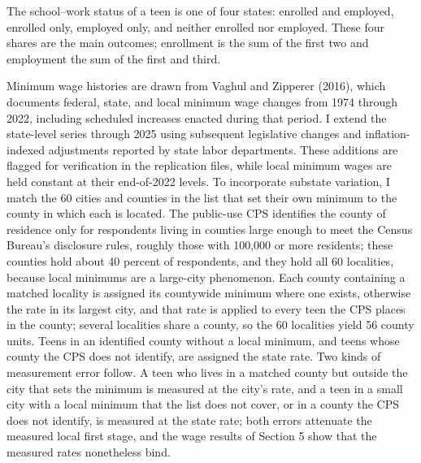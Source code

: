 \documentclass[12pt]{article}
\begin{document}
The school--work status of a teen is one of four states: enrolled and employed, enrolled only, employed only, and neither enrolled nor employed. These four shares are the main outcomes; enrollment is the sum of the first two and employment the sum of the first and third.

Minimum wage histories are drawn from Vaghul and Zipperer (2016), which documents federal, state, and local minimum wage changes from 1974 through 2022, including scheduled increases enacted during that period. I extend the state-level series through 2025 using subsequent legislative changes and inflation-indexed adjustments reported by state labor departments. These additions are flagged for verification in the replication files, while local minimum wages are held constant at their end-of-2022 levels. To incorporate substate variation, I match the 60 cities and counties in the list that set their own minimum to the county in which each is located. The public-use CPS identifies the county of residence only for respondents living in counties large enough to meet the Census Bureau's disclosure rules, roughly those with 100,000 or more residents; these counties hold about 40 percent of respondents, and they hold all 60 localities, because local minimums are a large-city phenomenon. Each county containing a matched locality is assigned its countywide minimum where one exists, otherwise the rate in its largest city, and that rate is applied to every teen the CPS places in the county; several localities share a county, so the 60 localities yield 56 county units. Teens in an identified county without a local minimum, and teens whose county the CPS does not identify, are assigned the state rate. Two kinds of measurement error follow. A teen who lives in a matched county but outside the city that sets the minimum is measured at the city's rate, and a teen in a small city with a local minimum that the list does not cover, or in a county the CPS does not identify, is measured at the state rate; both errors attenuate the measured local first stage, and the wage results of Section 5 show that the measured rates nonetheless bind.
\end{document}
